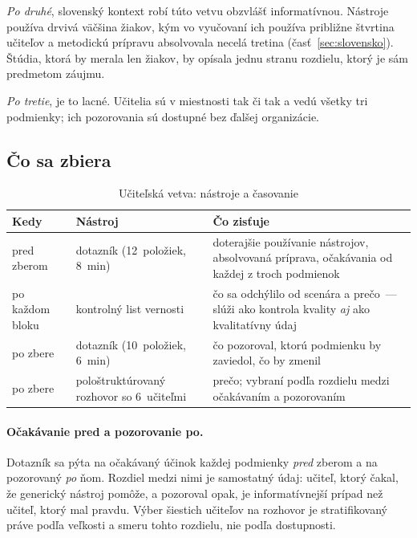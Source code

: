 \emph{Po druhé}, slovenský kontext robí túto vetvu obzvlášť informatívnou. Nástroje používa drvivá väčšina žiakov, kým vo vyučovaní ich používa približne štvrtina učiteľov a metodickú prípravu absolvovala necelá tretina (časť~\ref{sec:slovensko}). Štúdia, ktorá by merala len žiakov, by opísala jednu stranu rozdielu, ktorý je sám predmetom záujmu.

\emph{Po tretie}, je to lacné. Učitelia sú v miestnosti tak či tak a vedú všetky tri podmienky; ich pozorovania sú dostupné bez ďalšej organizácie.

\subsection{Čo sa zbiera}

\begin{table}[H]
\centering
\caption{Učiteľská vetva: nástroje a časovanie}
\label{tab:ucitelia}
\small
\begin{tabularx}{\textwidth}{@{}l l X@{}}
\toprule
\textbf{Kedy} & \textbf{Nástroj} & \textbf{Čo zisťuje} \\
\midrule
pred zberom & dotazník (12~položiek, 8~min) & doterajšie používanie nástrojov, absolvovaná príprava, očakávania od každej z troch podmienok \\
po každom bloku & kontrolný list vernosti & čo sa odchýlilo od scenára a prečo~--- slúži ako kontrola kvality \emph{aj} ako kvalitatívny údaj \\
po zbere & dotazník (10~položiek, 6~min) & čo pozoroval, ktorú podmienku by zaviedol, čo by zmenil \\
po zbere & pološtruktúrovaný rozhovor so 6~učiteľmi & prečo; vybraní podľa rozdielu medzi očakávaním a pozorovaním \\
\bottomrule
\end{tabularx}
\end{table}

\paragraph{Očakávanie pred a pozorovanie po.} Dotazník sa pýta na očakávaný účinok každej podmienky \emph{pred} zberom a na pozorovaný \emph{po} ňom. Rozdiel medzi nimi je samostatný údaj: učiteľ, ktorý čakal, že generický nástroj pomôže, a pozoroval opak, je informatívnejší prípad než učiteľ, ktorý mal pravdu. Výber šiestich učiteľov na rozhovor je stratifikovaný práve podľa veľkosti a smeru tohto rozdielu, nie podľa dostupnosti.

